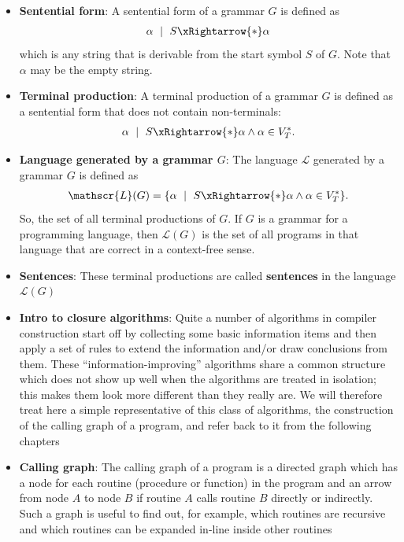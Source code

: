 \documentclass{report}
\begin{document}
\begin{itemize}
        \item \textbf{Sentential form}: A sentential form of a grammar $G$ is defined as
            \begin{align*}
                \alpha \ \mid \ S \xRightarrow{*} \alpha
            \end{align*}
            which is any string that is derivable from the start symbol $S$ of $G$. Note that $\alpha$ may be the empty string.
        \item \textbf{Terminal production}:  A terminal production of a grammar $G$ is defined as a sentential form that does not contain non-terminals:
            \begin{align*}
                \alpha \ \mid \ S \xRightarrow{*} \alpha \land \alpha \in V_{T}^{*}
            .\end{align*}
        \item \textbf{Language generated by a grammar $G$}: The language $\mathcal{L}$ generated by a grammar $G$ is defined as 
            \begin{align*}
                \mathscr{L}(G) = \{\alpha \ \mid \ S \xRightarrow{*} \alpha \land \alpha \in V_{T}^{*}\}
            .\end{align*}
            So, the set of all terminal productions of $G$. 
            \bigbreak \noindent 
            If $G$ is a grammar for a programming language, then $\mathscr{L}(G)$ is the set of all programs in that language that are correct in a context-free sense.
        \item \textbf{Sentences}: These terminal productions are called \textbf{sentences} in the language $\mathscr{L}(G) $
        \item \textbf{Intro to closure algorithms}: Quite a number of algorithms in compiler construction start off by collecting some basic information items and then apply a set of rules to extend the information and/or draw conclusions from them. These “information-improving” algorithms share a common structure which does not show up well when the algorithms are treated in isolation; this makes them look more different than they really are. We will therefore treat here a simple representative of this class of algorithms, the construction of the calling graph of a program, and refer back to it from the following chapters
        \item \textbf{Calling graph}: The calling graph of a program is a directed graph which has a node for each routine (procedure or function) in the program and an arrow from node $A$ to node $B$ if routine $A$ calls routine $B$ directly or indirectly. Such a graph is useful to find out, for example, which routines are recursive and which routines can be expanded in-line inside other routines

\end{itemize}
\end{document}
